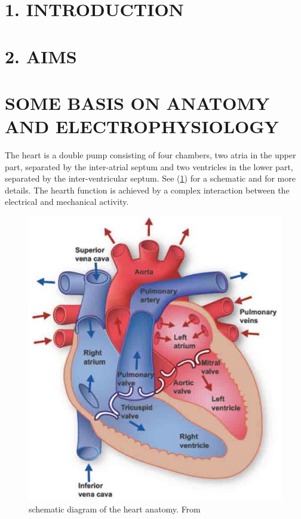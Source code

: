 \documentclass[letterpaper, twoside]{article}     	    %
\begin{document}




\tableofcontents
\newpage





\newpage

\newpage

\section{1. INTRODUCTION}

\newpage

\section{2. AIMS}

\newpage
\section{SOME BASIS ON ANATOMY AND ELECTROPHYSIOLOGY} \label{Some_Basis_on_Anatomy_and_Electrophysiology}

The heart is a double pump consisting of four chambers, two atria in the upper part, separated by the inter-atrial septum and two ventricles in the lower part, separated by the inter-ventricular septum. See (\ref{corazon}) for a schematic and \cite{electrofis} for more details. The hearth function is achieved by a complex interaction between the electrical and mechanical activity.

\begin{figure}[H] %
\centering
\includegraphics[height = 7 cm]{fig/fundamentals-corazon}
\caption{schematic diagram of the heart anatomy. From \cite{texas_inst} } \label{corazon}
\end{figure}
\end{document}
